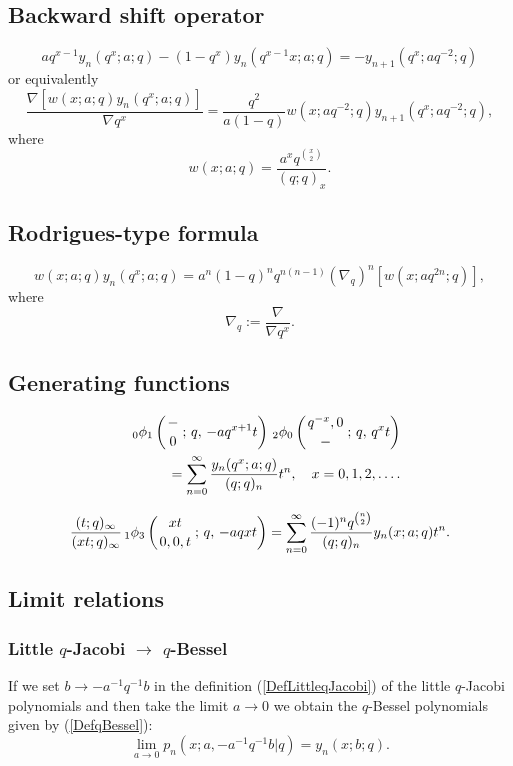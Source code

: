 \documentclass[envcountchap,graybox]{svmono}
\newcommand{\qhyp}[5]{\mbox{}_{#1}{\phi}_{#2}
\left(\genfrac{}{}{0pt}{}{#3}{#4}\,;\,q,\,#5\right)}
\begin{document}
\subsection*{Backward shift operator}
\begin{equation}
\label{shift2qBesselI}
aq^{x-1}y_n(q^x;a;q)-(1-q^x)y_n(q^{x-1}x;a;q)=-y_{n+1}(q^x;aq^{-2};q)
\end{equation}
or equivalently
\begin{equation}
\label{shift2qBesselII}
\frac{\nabla\left[w(x;a;q)y_n(q^x;a;q)\right]}{\nabla q^x}=
\frac{q^2}{a(1-q)}w(x;aq^{-2};q)y_{n+1}(q^x;aq^{-2};q),
\end{equation}
where
$$w(x;a;q)=\frac{a^xq^{\binom{x}{2}}}{(q;q)_x}.$$

\subsection*{Rodrigues-type formula}
\begin{equation}
\label{RodqBessel}
w(x;a;q)y_n(q^x;a;q)=a^n(1-q)^nq^{n(n-1)}\left(\nabla_q\right)^n\left[w(x;aq^{2n};q)\right],
\end{equation}
where
$$\nabla_q:=\frac{\nabla}{\nabla q^x}.$$

\subsection*{Generating functions}
\begin{eqnarray}
\label{GenqBessel1}
& &\qhyp{0}{1}{-}{0}{-aq^{x+1}t}\,\qhyp{2}{0}{q^{-x},0}{-}{q^xt}\nonumber\\
& &{}=\sum_{n=0}^{\infty}\frac{y_n(q^x;a;q)}{(q;q)_n}t^n,\quad x=0,1,2,\ldots.
\end{eqnarray}

\begin{equation}
\label{GenqBessel2}
\frac{(t;q)_{\infty}}{(xt;q)_{\infty}}\,\qhyp{1}{3}{xt}{0,0,t}{-aqxt}=
\sum_{n=0}^{\infty}\frac{(-1)^nq^{\binom{n}{2}}}{(q;q)_n}y_n(x;a;q)t^n.
\end{equation}

\subsection*{Limit relations}

\subsubsection*{Little $q$-Jacobi $\rightarrow$ $q$-Bessel}
If we set $b\rightarrow -a^{-1}q^{-1}b$ in the definition (\ref{DefLittleqJacobi}) of
the little $q$-Jacobi polynomials and then take the limit $a\rightarrow 0$ we obtain
the $q$-Bessel polynomials given by (\ref{DefqBessel}):
$$\lim_{a\rightarrow 0}p_n(x;a,-a^{-1}q^{-1}b|q)=y_n(x;b;q).$$
\end{document}
